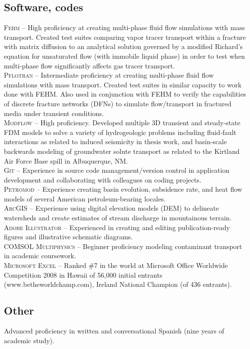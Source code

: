 \documentclass[11pt, letterpaper]{article}
\begin{document}
\subsection*{Software, codes}
\noindent
\textsc{Fehm} – High proficiency at creating multi-phase fluid flow simulations with mass transport. Created test suites comparing vapor tracer transport within a fracture with matrix diffusion to an analytical solution governed by a modified Richard’s equation for unsaturated flow (with immobile liquid phase) in order to test when multi-phase flow significantly affects gas tracer transport.\\[5pt]
\textsc{Pflotran} – Intermediate proficiency at creating multi-phase fluid flow simulations with mass transport. Created test suites in similar capacity to work done with FEHM. Also used in conjunction with FEHM to verify the capabilities of discrete fracture networks (DFNs) to simulate flow/transport in fractured media under transient conditions.\\[5pt]
\textsc{Modflow} – High proficiency. Developed multiple 3D transient and steady-state FDM models to solve a variety of hydrogeologic problems including fluid-fault interactions as related to induced seismicity in thesis work, and basin-scale backwards modeling of groundwater solute transport as related to the Kirtland Air Force Base spill in Albuquerque, NM.\\[5pt]
\textsc{Git} – Experience in source code management/version control in application development and collaborating with colleagues on coding projects.\\[5pt]
\textsc{Petromod} – Experience creating basin evolution, subsidence rate, and heat flow models of several American petroleum-bearing locales.\\[5pt] 
\textsc{ArcGIS} – Experience using digital elevation models (DEM) to delineate watersheds and create estimates of stream discharge in mountainous terrain.\\[5pt] 
\textsc{Adobe Illustrator} – Experienced in creating and editing publication-ready figures and illustrative schematic diagrams.\\[5pt] 
\textsc{COMSOL Multiphysics} – Beginner proficiency modeling contaminant transport in academic coursework.\\[5pt] 
\textsc{Microsoft Excel} – Ranked \#7 in the world at Microsoft Office Worldwide Competition 2008 in Hawaii of 56,000 initial entrants (www.betheworldchamp.com), Ireland National Champion (of 436 entrants).
\subsection*{Other}
\noindent
Advanced proficiency in written and conversational Spanish (nine years of academic study).
\end{document}
